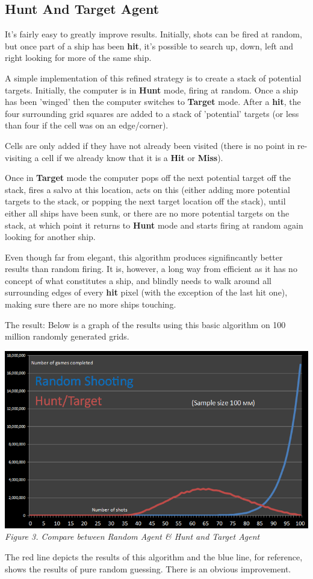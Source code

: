 \documentclass{article}
\begin{document}
\begin{multicols}{2}
\subsection{Hunt And Target Agent}
It's fairly easy to greatly improve results. Initially, shots can be fired at random, but once part of a ship has been \textbf{hit}, it's possible to search up, down, left and right looking for more of the same ship.
	
A simple implementation of this refined strategy is to create a stack of potential targets. Initially, the computer is in \textbf{Hunt} mode, firing at random. Once a ship has been 'winged' then the computer switches to \textbf{Target} mode. After a \textbf{hit}, the four surrounding grid squares are added to a stack of 'potential' targets (or less than four if the cell was on an edge/corner).

Cells are only added if they have not already been visited (there is no point in re-visiting a cell if we already know that it is a \textbf{Hit} or \textbf{Miss}).

Once in \textbf{Target} mode the computer pops off the next potential target off the stack, fires a salvo at this location, acts on this (either adding more potential targets to the stack, or popping the next target location off the stack), until either all ships have been sunk, or there are no more potential targets on the stack, at which point it returns to \textbf{Hunt} mode and starts firing at random again looking for another ship.

Even though far from elegant, this algorithm produces signifincantly better results than random firing. It is, however, a long way from efficient as it has no concept of what constitutes a ship, and blindly needs to walk around all surrounding edges of every \textbf{hit} pixel (with the exception of the last hit one), making sure there are no more ships touching.

The result: Below is a graph of the results using this basic algorithm on 100 million randomly generated grids.
\begin{center}
\includegraphics[scale=.35]{b1}
\textit{Figure 3. Compare between Random Agent \& Hunt and Target Agent}
\end{center}
The red line depicts the results of this algorithm and the blue line, for reference, shows the results of pure random guessing. There is an obvious improvement.

\end{multicols}
\end{document}

